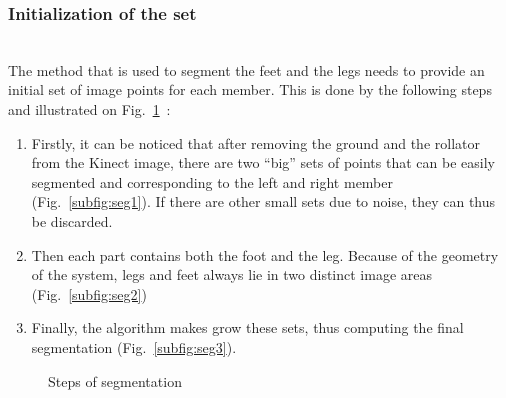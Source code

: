 \documentclass[letterpaper, 10 pt, conference]{ieeeconf}
\newcommand{\CDOK}[2]{{#1}} %
\begin{document}
\subsubsection{Initialization of the set}~\\
The method that is used to segment the feet and the legs needs to provide an initial set of image points for each member. This is done by the following steps and illustrated on Fig.~\ref{fig:segmentation}~:
\begin{enumerate}
	\item Firstly, it can be noticed that after removing the ground and the rollator from the Kinect image, there are two ``big'' sets of points that can be easily segmented and corresponding to the left and right member (Fig.~\ref{subfig:seg1}). If there are other small sets due to noise, they can thus be discarded.
	\item Then each part contains both the foot and the leg. Because of the geometry of the system, \CDOK{legs and feet always lie in two distinct image areas}{ the bottom part corresponds systematically to the leg. Thus, we chose to initialize the leg with the last bottom quarter and the foot with the first bottom quarter}  (Fig.~\ref{subfig:seg2})
	\item Finally, the algorithm makes grow these sets, thus computing the final segmentation (Fig.~\ref{subfig:seg3}).
\end{enumerate}
\begin{figure}
	\centering
	\hfill
	 \hfill
	\caption{Steps of segmentation}
	\label{fig:segmentation}
\end{figure}
\end{document}
